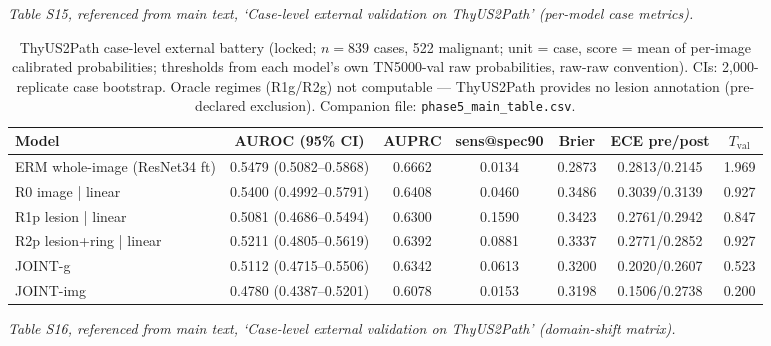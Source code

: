 \documentclass[11pt]{article}
\begin{document}
\noindent\emph{Table S15, referenced from main text, `Case-level external validation on ThyUS2Path' (per-model case metrics).}

\begin{table}[!ht]
\centering\scriptsize
\setlength{\tabcolsep}{3pt}
\caption{ThyUS2Path case-level external battery (locked; $n{=}839$ cases,
522 malignant; unit = case, score = mean of per-image calibrated
probabilities; thresholds from each model's own TN5000-val raw
probabilities, raw-raw convention). CIs: 2{,}000-replicate case
bootstrap. Oracle regimes (R1g/R2g) not computable --- ThyUS2Path
provides no lesion annotation (pre-declared exclusion). Companion file:
\texttt{phase5\_main\_table.csv}.}
\label{tab:phase5_main}
\begin{tabular}{lcccccc}
\toprule
Model & AUROC (95\% CI) & AUPRC & sens@spec90 & Brier & ECE pre/post & $T_{\mathrm{val}}$ \\
\midrule
ERM whole-image (ResNet34 ft) & 0.5479 (0.5082--0.5868) & 0.6662 & 0.0134 & 0.2873 & 0.2813/0.2145 & 1.969 \\
R0 image | linear             & 0.5400 (0.4992--0.5791) & 0.6408 & 0.0460 & 0.3486 & 0.3039/0.3139 & 0.927 \\
R1p lesion | linear           & 0.5081 (0.4686--0.5494) & 0.6300 & 0.1590 & 0.3423 & 0.2761/0.2942 & 0.847 \\
R2p lesion+ring | linear      & 0.5211 (0.4805--0.5619) & 0.6392 & 0.0881 & 0.3337 & 0.2771/0.2852 & 0.927 \\
JOINT-g                       & 0.5112 (0.4715--0.5506) & 0.6342 & 0.0613 & 0.3200 & 0.2020/0.2607 & 0.523 \\
JOINT-img                     & 0.4780 (0.4387--0.5201) & 0.6078 & 0.0153 & 0.3198 & 0.1506/0.2738 & 0.200 \\
\bottomrule
\end{tabular}
\end{table}

\noindent\emph{Table S16, referenced from main text, `Case-level external validation on ThyUS2Path' (domain-shift matrix).}
\end{document}
